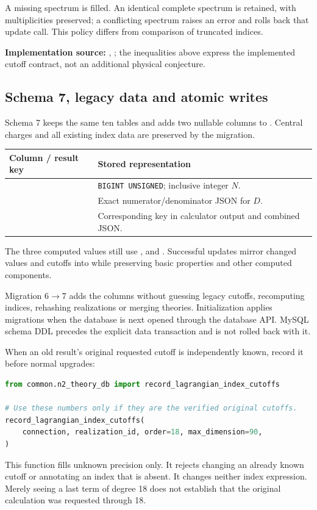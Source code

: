 A missing spectrum is filled. An identical complete spectrum is retained, with
multiplicities preserved; a conflicting spectrum raises an error and rolls back
that update call. This policy differs from comparison of truncated indices.

{\small\textbf{Implementation source:} ,
; the inequalities above express the implemented
cutoff contract, not an additional physical conjecture.}

\clearpage
\subsection{Schema 7, legacy data and atomic writes}
Schema 7 keeps the same ten tables and adds two nullable columns to
. Central charges and all existing index data are
preserved by the migration.
\begin{tabularx}{\textwidth}{@{}Y>{\raggedright\arraybackslash}p{57mm}@{}}
\toprule Column / result key & Stored representation\\\midrule
{} & \texttt{BIGINT UNSIGNED}; inclusive integer $N$.\\
 & Exact numerator/denominator JSON for $D$.\\
 & Corresponding key in calculator output and combined JSON.\\\bottomrule
\end{tabularx}
The three computed values still use ,
 and .
Successful updates mirror changed values and cutoffs into 
while preserving basic properties and other computed components.

Migration $6\to7$ adds the columns without guessing legacy cutoffs, recomputing
indices, rehashing realizations or merging theories. Initialization applies
migrations when the database is next opened through the database API. MySQL
schema DDL precedes the explicit data transaction and is not rolled back with it.

When an old result's original requested cutoff is independently known, record
it before normal upgrades:
\begin{lstlisting}[language=Python]
from common.n2_theory_db import record_lagrangian_index_cutoffs

# Use these numbers only if they are the verified original cutoffs.
record_lagrangian_index_cutoffs(
    connection, realization_id, order=18, max_dimension=90,
)
\end{lstlisting}
This function fills unknown precision only. It rejects changing an already
known cutoff or annotating an index that is absent. It changes neither index
expression. Merely seeing a last term of degree 18 does not establish that the
original calculation was requested through 18.

